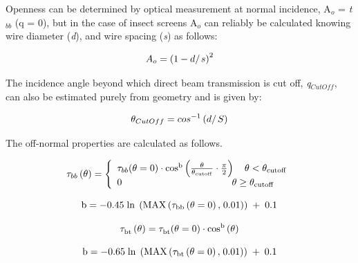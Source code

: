 Openness can be determined by optical measurement at normal incidence, A\(_{o}\) = \emph{t}\(_{bb}\) (q = 0), but in the case of insect screens A\(_{o}\) can reliably be calculated knowing wire diameter (\emph{d}), and wire spacing (\emph{s}) as follows:

\begin{equation}
{A_o} = {\left( {1 - {d \mathord{\left/ {\vphantom {d s}} \right. } s}} \right)^2}
\end{equation}

The incidence angle beyond which direct beam transmission is cut off, \emph{q}\(_{CutOff}\), can also be estimated purely from geometry and is given by:

\begin{equation}
{\theta_{CutOff}} = co{s^{ - 1}}\left( {{d \mathord{\left/ {\vphantom {d S}} \right. } S}} \right)
\end{equation}

The off-normal properties are calculated as follows.

\begin{equation}
{\tau_{bb}}\left( {\rm{\theta }} \right) = \left\{ \begin{array}{l}{\tau_{bb}}{\rm{(\theta }} = {\rm{0)}} \cdot {\rm{co}}{{\rm{s}}^{\rm{b}}}\left( {\frac{{\rm{\theta }}}{{{{\rm{\theta }}_{{\rm{cutoff}}}}}} \cdot \frac{\pi }{{\rm{2}}}} \right)\quad {\rm{\theta }} < {{\rm{\theta }}_{{\rm{cutoff}}}}\\0\quad \quad \quad \quad \quad \quad \quad \quad \quad \quad \quad \;\,{\rm{\theta }} \ge {{\rm{\theta }}_{{\rm{cutoff}}}}\end{array} \right.
\end{equation}

\begin{equation}
{\rm{b}} =  - {\rm{0}}{\rm{.45}}\;{\rm{ln}}\;\left( {{\rm{MAX}}\left( {{{\rm{\tau }}_{{\rm{bb}}}}\left( {{\rm{\theta }} = {\rm{0}}} \right){\rm{,}}\;{\rm{0}}{\rm{.01}}} \right)} \right)\; + \;{\rm{0}}{\rm{.1}}
\end{equation}

\begin{equation}
{\rm{\tau }}_{{\rm{bt}}}^{}\left( {\rm{\theta }} \right) = {\rm{\tau }}_{{\rm{bt}}}^{}{\rm{(\theta }} = {\rm{0)}} \cdot {\rm{co}}{{\rm{s}}^{\rm{b}}}\left( {\rm{\theta }} \right)
\end{equation}

\begin{equation}
{\rm{b}} =  - {\rm{0}}{\rm{.65}}\;{\rm{ln}}\;\left( {{\rm{MAX}}\left( {{{\rm{\tau }}_{{\rm{bt}}}}\left( {{\rm{\theta }} = {\rm{0}}} \right){\rm{,}}\;{\rm{0}}{\rm{.01}}} \right)} \right)\; + \;{\rm{0}}{\rm{.1}}
\end{equation}

